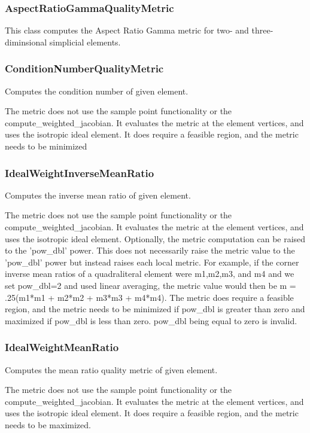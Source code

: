 \subsubsection{AspectRatioGammaQualityMetric}

This class computes the Aspect Ratio Gamma metric for two- and three-diminsional simplicial elements.

\subsubsection{ConditionNumberQualityMetric}

  Computes the condition number of given element.

     The metric does not use the sample point functionality or the compute\_weighted\_jacobian.  It evaluates the metric at  the element vertices, and uses the isotropic ideal element. It does require a feasible region, and the metric needs to be minimized

\subsubsection{IdealWeightInverseMeanRatio}

Computes the inverse mean ratio of given element.

The metric does not use the sample point functionality or the compute\_weighted\_jacobian.  It evaluates the metric at the element vertices, and uses the isotropic ideal element.  Optionally, the metric computation can be raised to the 'pow\_dbl' power.  This does not necessarily raise the metric value to the 'pow\_dbl' power but instead raises each local metric.  For example, if the corner inverse mean ratios of a quadraliteral element were m1,m2,m3, and m4 and we set pow\_dbl=2 and used linear averaging, the metric value would then be m = .25(m1*m1 + m2*m2 + m3*m3 + m4*m4).  The metric does require a feasible region, and the metric needs to be minimized if pow\_dbl is greater than zero and maximized if pow\_dbl is less than zero.  pow\_dbl being equal to zero is invalid.

\subsubsection{IdealWeightMeanRatio}

Computes the mean ratio quality metric of given element.

 The metric does not use the sample point functionality or the     compute\_weighted\_jacobian.  It evaluates the metric at the element vertices, and uses the isotropic ideal element.  It does require a feasible region, and the metric needs to be maximized.

